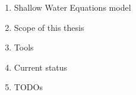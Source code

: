 




\begin{frame}
    
    \begin{enumerate}
    \item Shallow Water Equations model \vspace{0.5cm}
    \item Scope of this thesis\vspace{0.5cm}
    \item Tools\vspace{0.5cm}
    \item Current status\vspace{0.5cm}
    \item TODOs
    \end{enumerate}




\end{frame}
\clearpage


